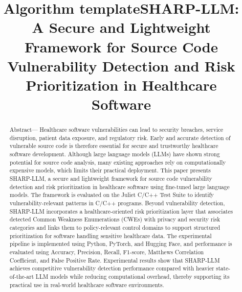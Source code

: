 \documentclass[conference]{IEEEtran}
\title{Algorithm template}
\begin{document}
\title{SHARP-LLM: A Secure and Lightweight Framework for Source Code Vulnerability Detection and Risk Prioritization in Healthcare Software} \\

\author{
}

\maketitle

\begin{abstract}
Abstract— Healthcare software vulnerabilities can lead to security breaches, service disruption, patient data exposure, and regulatory risk. Early and accurate detection of vulnerable source code is therefore essential for secure and trustworthy healthcare software development. Although large language models (LLMs) have shown strong potential for source code analysis, many existing approaches rely on computationally expensive models, which limits their practical deployment. This paper presents SHARP-LLM, a secure and lightweight framework for source code vulnerability detection and risk prioritization in healthcare software using fine-tuned large language models. The framework is evaluated on the Juliet C/C++ Test Suite to identify vulnerability-relevant patterns in C/C++ programs. Beyond vulnerability detection, SHARP-LLM incorporates a healthcare-oriented risk prioritization layer that associates detected Common Weakness Enumerations (CWEs) with privacy and security risk categories and links them to policy-relevant control domains to support structured prioritization for software handling sensitive healthcare data. The experimental pipeline is implemented using Python, PyTorch, and Hugging Face, and performance is evaluated using Accuracy, Precision, Recall, F1-score, Matthews Correlation Coefficient, and False Positive Rate. Experimental results show that SHARP-LLM achieves competitive vulnerability detection performance compared with heavier state-of-the-art LLM models while reducing computational overhead, thereby supporting its practical use in real-world healthcare software environments.
\end{abstract}
\end{document}
